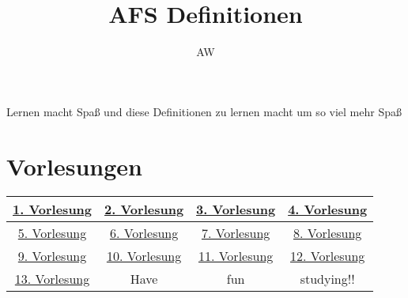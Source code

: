 \documentclass[12pt, a4paper]{article}
\author{AW}
\title{AFS Definitionen}
\begin{document}
	\tableofcontents
	
	Lernen macht Spaß und diese Definitionen zu lernen macht um so viel mehr Spaß
	\section{Vorlesungen}
	\begin{tabular}{|c|c|c|c|}
		\hline
		\href{https://studip.uni-trier.de/sendfile.php?type=0&file_id=40e88e3511cc7c014f92d59d4240f758&file_name=VL1.pdf}{1. Vorlesung} &
		\href{https://studip.uni-trier.de/sendfile.php?type=0&file_id=83576c7d025a4dd2a914bf0f42ef01c6&file_name=VL2.pdf}{2. Vorlesung} &
		\href{https://studip.uni-trier.de/sendfile.php?type=0&file_id=7254db8a14e104a42bcc136f907c13f7&file_name=VL3.pdf}{3. Vorlesung} &
		\href{https://studip.uni-trier.de/sendfile.php?type=0&file_id=d7f5ccaa04f252429182d99cf9ca34ef&file_name=VL4.pdf}{4. Vorlesung} \\
		\hline
		\href{https://studip.uni-trier.de/sendfile.php?type=0&file_id=7158e0b195c347b16d09cd8414db6d81&file_name=VL5.pdf}{5. Vorlesung} &
		\href{https://studip.uni-trier.de/sendfile.php?type=0&file_id=b274884a7f73e12a58ed308a11755d37&file_name=VL6.pdf}{6. Vorlesung} &
		\href{https://studip.uni-trier.de/sendfile.php?type=0&file_id=891c1354eaec06674b1618aa9ab2c1bb&file_name=VL7.pdf}{7. Vorlesung} &
		\href{https://studip.uni-trier.de/sendfile.php?type=0&file_id=d3f57f928801381977f6140ff3fe188b&file_name=VL8.pdf}{8. Vorlesung} \\
		\hline
		\href{https://studip.uni-trier.de/sendfile.php?type=0&file_id=e02ed989059a577fa312092bb26e281b&file_name=VL9.pdf}{9. Vorlesung} &
		\href{https://studip.uni-trier.de/sendfile.php?type=0&file_id=f842291bc02d44a2b7f867438fc8925c&file_name=VL10.pdf}{10. Vorlesung} &
		\href{https://studip.uni-trier.de/sendfile.php?type=0&file_id=34c4a9522c6b2cd5541e842f806e168c&file_name=VL11.pdf}{11. Vorlesung} &
		\href{}{12. Vorlesung} \\
		\hline
		\href{https://studip.uni-trier.de/sendfile.php?type=0&file_id=84849fa5daf3b28b9a645f29ed890e00&file_name=VL13.pdf}{13. Vorlesung} &
		Have & fun & studying!!\\
		\hline
	\end{tabular}
	
\end{document}
